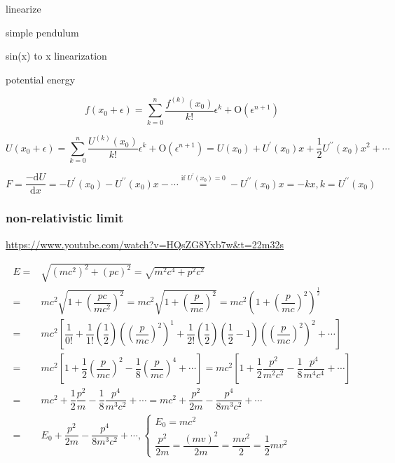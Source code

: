 \documentclass[
]{book}
\theoremstyle{definition}
\theoremstyle{definition}
\theoremstyle{definition}
\theoremstyle{definition}
\theoremstyle{remark}
\begin{document}
linearize

simple pendulum

sin(x) to x linearization

potential energy

\[
f\left(x_{{\scriptscriptstyle 0}}+\epsilon\right)=\sum\limits _{k=0}^{n}\frac{f^{\left(k\right)}\left(x_{{\scriptscriptstyle 0}}\right)}{k!}\epsilon^{k}+\mathrm{O}\left(\epsilon^{n+1}\right)
\]

\[
U\left(x_{{\scriptscriptstyle 0}}+\epsilon\right)=\sum\limits _{k=0}^{n}\frac{U^{\left(k\right)}\left(x_{{\scriptscriptstyle 0}}\right)}{k!}\epsilon^{k}+\mathrm{O}\left(\epsilon^{n+1}\right)=U\left(x_{{\scriptscriptstyle 0}}\right)+U^{\prime}\left(x_{{\scriptscriptstyle 0}}\right)x+\dfrac{1}{2}U^{\prime\prime}\left(x_{{\scriptscriptstyle 0}}\right)x^{2}+\cdots
\]

\[
F=\dfrac{-\mathrm{d}U}{\mathrm{d}x}=-U^{\prime}\left(x_{{\scriptscriptstyle 0}}\right)-U^{\prime\prime}\left(x_{{\scriptscriptstyle 0}}\right)x-\cdots\overset{\text{if }U^{\prime}\left(x_{{\scriptscriptstyle 0}}\right)=0}{=}-U^{\prime\prime}\left(x_{{\scriptscriptstyle 0}}\right)x=-kx,k=U^{\prime\prime}\left(x_{{\scriptscriptstyle 0}}\right)
\]

\subsubsection{non-relativistic limit}\label{non-relativistic-limit}

\url{https://www.youtube.com/watch?v=HQsZG8Yxb7w&t=22m32s}

\[
\begin{aligned}
E= & \sqrt{\left(mc^{2}\right)^{2}+\left(pc\right)^{2}}=\sqrt{m^{2}c^{4}+p^{2}c^{2}}\\
= & mc^{2}\sqrt{1+\left(\dfrac{pc}{mc^{2}}\right)^{2}}=mc^{2}\sqrt{1+\left(\dfrac{p}{mc}\right)^{2}}=mc^{2}\left(1+\left(\dfrac{p}{mc}\right)^{2}\right)^{\frac{1}{2}}\\
= & mc^{2}\left[\dfrac{1}{0!}+\dfrac{1}{1!}\left(\dfrac{1}{2}\right)\left(\left(\dfrac{p}{mc}\right)^{2}\right)^{1}+\dfrac{1}{2!}\left(\dfrac{1}{2}\right)\left(\dfrac{1}{2}-1\right)\left(\left(\dfrac{p}{mc}\right)^{2}\right)^{2}+\cdots\right]\\
= & mc^{2}\left[1+\dfrac{1}{2}\left(\dfrac{p}{mc}\right)^{2}-\dfrac{1}{8}\left(\dfrac{p}{mc}\right)^{4}+\cdots\right]=mc^{2}\left[1+\dfrac{1}{2}\dfrac{p^{2}}{m^{2}c^{2}}-\dfrac{1}{8}\dfrac{p^{4}}{m^{4}c^{4}}+\cdots\right]\\
= & mc^{2}+\dfrac{1}{2}\dfrac{p^{2}}{m}-\dfrac{1}{8}\dfrac{p^{4}}{m^{3}c^{2}}+\cdots=mc^{2}+\dfrac{p^{2}}{2m}-\dfrac{p^{4}}{8m^{3}c^{2}}+\cdots\\
= & E_{{\scriptscriptstyle 0}}+\dfrac{p^{2}}{2m}-\dfrac{p^{4}}{8m^{3}c^{2}}+\cdots,\begin{cases}
E_{{\scriptscriptstyle 0}}=mc^{2}\\
\dfrac{p^{2}}{2m}=\dfrac{\left(mv\right)^{2}}{2m}=\dfrac{mv^{2}}{2}=\dfrac{1}{2}mv^{2}
\end{cases}
\end{aligned}
\]
\end{document}

